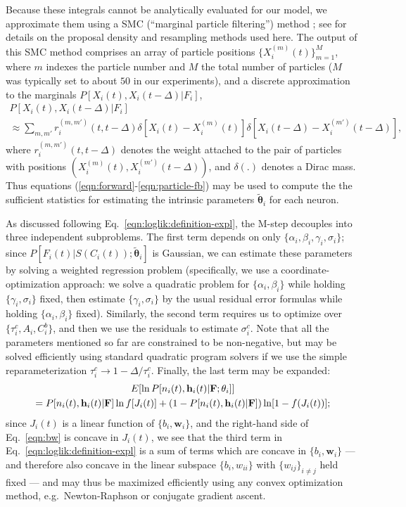 \documentclass[aoas,preprint]{imsart}
\newcommand{\bth}{\mathbf{\theta}}
\newcommand{\w}{w}
\newcommand{\bw}{\mathbf{\w}}
\newcommand{\bF}{{\bf F}}
\newcommand{\bh}{\mathbf{h}}
\newcommand{\tbth}{\tilde{\bth}}
\begin{document}
Because these integrals cannot be analytically evaluated for our
model, we approximate them using a SMC (``marginal particle
filtering'') method \cite{DGA00,DFG01,GDW04}; see
\cite{Vogelstein2009} for details on the proposal density and
resampling methods used here. The output of this SMC method comprises
an array of particle positions $\{X_i^{(m)}(t)\}_{m=1}^{M}$, where $m$
indexes the particle number and $M$ the total number of particles ($M$
was typically set to about $50$ in our experiments), and a discrete
approximation to the marginals $P[X_i(t), X_i(t-\Delta) | F_i]$,
\begin{multline}
P[X_i(t), X_i(t-\Delta) | F_i] \\ \approx \sum_{m,m'}
r_i^{(m,m')}(t,t-\Delta) \delta \left[ X_i(t) - X_i^{(m)}(t) \right]
\delta \left[ X_i(t-\Delta) - X_i^{(m')}(t-\Delta) \right],
\label{eqn:particle-fb}
\end{multline}
where $r_i^{(m,m')}(t,t-\Delta)$ denotes the weight attached to the
pair of particles with positions $\left( X_i^{(m)}(t),
X_i^{(m')}(t-\Delta) \right)$, and $\delta(.)$ denotes a Dirac mass.
Thus equations (\ref{eqn:forward}-\ref{eqn:particle-fb}) may be used
to compute the the sufficient statistics for estimating the
intrinsic parameters $\tbth_i$ for each neuron. 

As discussed following Eq.~\eqref{eqn:loglik:definition-expl}, the
M-step decouples into three independent subproblems. The first term
depends on only $\{\alpha_i, \beta_i, \gamma_i, \sigma_i\}$; since
$P[F_i(t)|S(C_i(t)); \tbth_i]$ is Gaussian, we can estimate these
parameters by solving a weighted regression problem (specifically, we
use a coordinate-optimization approach: we solve a quadratic problem
for $\{\alpha_i, \beta_i\}$ while holding $\{\gamma_i, \sigma_i\}$
fixed, then estimate $\{\gamma_i,\sigma_i\}$ by the usual residual
error formulas while holding $\{\alpha_i, \beta_i\}$
fixed). Similarly, the second term requires us to optimize over
$\{\tau_i^c, A_i, C_i^b\}$, and then we use the residuals to estimate
$\sigma_i^c$. Note that all the parameters mentioned so far are
constrained to be non-negative, but may be solved efficiently using
standard quadratic program solvers if we use the simple
reparameterization $\tau_i^c \to 1- \Delta / \tau_i^c$. Finally, the
last term may be expanded:
\begin{multline}
E [\ln P[n_i(t), \bh_i(t) | \bF; \bth_i]] \\ = P[n_i(t), \bh_i(t) |
\bF] \ln f [J_i(t)] + (1-P[n_i(t), \bh_i(t) | \bF]) \ln [1-
f(J_i(t))];
\label{eqn:bw}
\end{multline}
since $J_i(t)$ is a linear function of $\{b_i,\bw_i\}$, and the
right-hand side of Eq.~\eqref{eqn:bw} is concave in $J_i(t)$, we see
that the third term in Eq.~\eqref{eqn:loglik:definition-expl} is a sum
of terms which are concave in $\{b_i,\bw_i\}$ --- and therefore also
concave in the linear subspace $\{b_i,w_{ii}\}$ with $\{w_{ij}\}_{i
\neq j}$ held fixed --- and may thus be maximized efficiently using
any convex optimization method, e.g.\ Newton-Raphson or conjugate
gradient ascent.
\end{document}
